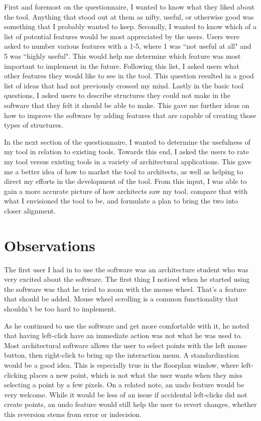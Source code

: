 \documentclass{thesis}
\begin{document}
First and foremost on the questionnaire, I wanted to know what they liked about the tool.  Anything that stood out at them as
nifty, useful, or otherwise good was something that I probably wanted to keep.  Secondly, I wanted to know which of a list
of potential features would be most appreciated by the users.  Users were asked to number various features with a 1-5, where
1 was ``not useful at all" and 5 was ``highly useful".  This would help me determine which feature was most important to
implement in the future.  Following this list, I asked users what other features they would like to see in the tool.  This
question resulted in a good list of ideas that had not previously crossed my mind.  Lastly in the basic tool questions, I
asked users to describe structures they could not make in the software that they felt it should be able to make.  This gave
me further ideas on how to improve the software by adding features that are capable of creating those types of structures.

In the next section of the questionnaire, I wanted to determine the usefulness of my tool in relation to existing tools.  Towards
this end, I asked the users to rate my tool versus existing tools in a variety of architectural applications.  This gave me a
better idea of how to market the tool to architects, as well as helping to direct my efforts in the development of the tool.
From this input, I was able to gain a more accurate picture of how architects saw my tool, compare that with what I
envisioned the tool to be, and formulate a plan to bring the two into closer alignment.

\section{Observations}
The first user I had in to use the software was an architecture student who was very excited about the software.
The first thing I noticed when he started using the software was that he tried to zoom with the mouse wheel.  That's a feature that
should be added.  Mouse wheel scrolling is a common functionality that shouldn't be too hard to implement.

As he continued to use the software and get more comfortable with it, he noted that having left-click have an immediate action was not
what he was used to. Most architectural software allows the user to select points with the left mouse button, then right-click to
bring up the interaction menu.  A standardization would be a good idea.  This is especially true in the floorplan window, where
left-clicking places a new point, which is not what the user wants when they miss selecting a point by a few pixels.  On a related
note, an undo feature would be very welcome.  While it would be less of an issue if accidental left-clicks did not create points,
an undo feature would still help the user to revert changes, whether this reversion stems from error or indecision.
\end{document}
